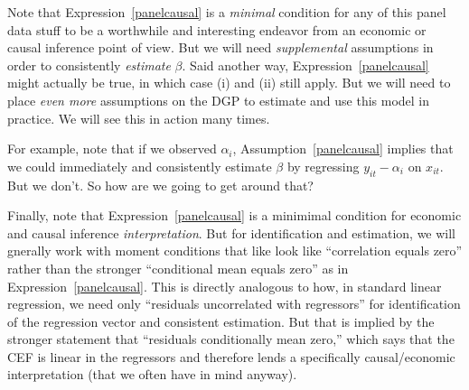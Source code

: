 \documentclass[12pt]{article}
\theoremstyle{plain}
\theoremstyle{definition}
\theoremstyle{remark}
\begin{document}
Note that Expression~\ref{panelcausal} is a \emph{minimal}
condition for any of this panel data stuff to be a worthwhile and
interesting endeavor from an economic or causal inference point of view.
But we will need \emph{supplemental} assumptions in order to
consistently \emph{estimate} $\beta$.
Said another way, Expression~\ref{panelcausal} might actually be
true, in which case (i) and (ii) still apply.
But we will need to place \emph{even more} assumptions on the
DGP to estimate and use this model in practice.
We will see this in action many times.

For example, note that if we observed $\alpha_i$,
Assumption~\ref{panelcausal} implies that we could immediately and
consistently estimate $\beta$ by regressing $y_{it}-\alpha_i$ on
$x_{it}$.
But we don't.
So how are we going to get around that?

Finally, note that Expression~\ref{panelcausal} is a minimimal condition
for economic and causal inference \emph{interpretation}.
But for identification and estimation, we will gnerally work with moment
conditions that like look like ``correlation equals zero'' rather than
the stronger ``conditional mean equals zero'' as in
Expression~\ref{panelcausal}.
This is directly analogous to how, in standard linear regression,
we need only ``residuals uncorrelated with regressors'' for
identification of the regression vector and consistent estimation.
But that is implied by the stronger statement that ``residuals
conditionally mean zero,'' which says that the CEF is linear in the
regressors and therefore lends a specifically causal/economic
interpretation (that we often have in mind anyway).
\end{document}
